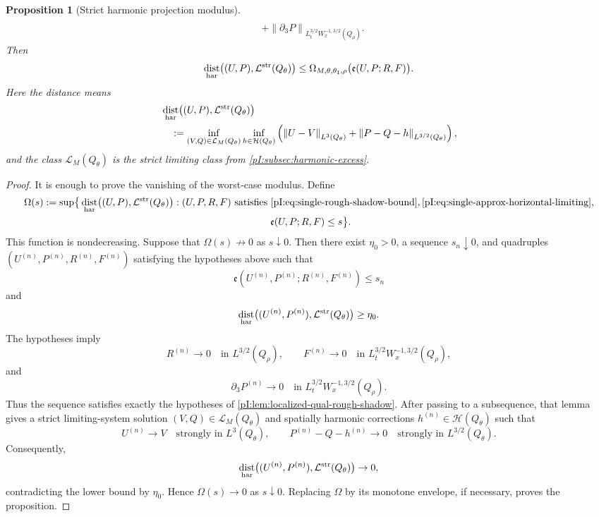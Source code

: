 \documentclass[11pt]{article}
\numberwithin{equation}{section}
\theoremstyle{plain}
\newtheorem{proposition}{Proposition}[section]
\theoremstyle{definition}
\theoremstyle{remark}
\DeclareMathOperator{\dist}{dist}
\newcommand{\norm}[2]{\left\|#1\right\|_{#2}}
\newcommand{\calH}{\mathcal H}
\newcommand{\calL}{\mathcal L}
\begin{document}
\begin{proposition}[Strict harmonic projection modulus]
\begin{equation}
\begin{aligned}
        \\
        &+\norm{\partial_3P}{L^{3/2}_tW^{-1,3/2}_x(Q_\rho)} .
\end{aligned}
\end{equation}
Then
\begin{equation}\label{pI:eq:strict-projection-modulus-bound}
        \dist_{\rm har}
        \bigl((U,P),\calL^{\rm str}(Q_\theta)\bigr)
        \le
        \Omega_{M,\theta,\theta_1,\rho}
        \bigl(\mathfrak e(U,P;R,F)\bigr).
\end{equation}
Here the distance means
\[
\begin{aligned}
&\dist_{\rm har}\bigl((U,P),\calL^{\rm str}(Q_\theta)\bigr)
\\
&\quad:=
\inf_{(V,Q)\in\calL_M(Q_\theta)}
\inf_{h\in\calH(Q_\theta)}
\left(
\norm{U-V}{L^3(Q_\theta)}
+
\norm{P-Q-h}{L^{3/2}(Q_\theta)}
\right),
\end{aligned}
\]
and the class \(\calL_M(Q_\theta)\) is the strict limiting class from \cref{pI:subsec:harmonic-excess}.
\end{proposition}

\begin{proof}
It is enough to prove the vanishing of the worst-case modulus.  Define
\[
\begin{aligned}
        \Omega(s):=\sup\bigl\{&
        \dist_{\rm har}\bigl((U,P),\calL^{\rm str}(Q_\theta)\bigr):
        (U,P,R,F)\text{ satisfies }
        \eqref{pI:eq:single-rough-shadow-bound},\eqref{pI:eq:single-approx-horizontal-limiting},
        \\
        &\hspace{6.8cm}
        \mathfrak e(U,P;R,F)\le s
        \bigr\}.
\end{aligned}
\]
This function is nondecreasing.  Suppose that \(\Omega(s)\not\to0\) as \(s\downarrow0\).  Then there exist \(\eta_0>0\), a sequence \(s_n\downarrow0\), and quadruples \((U^{(n)},P^{(n)},R^{(n)},F^{(n)})\) satisfying the hypotheses above such that
\[
        \mathfrak e(U^{(n)},P^{(n)};R^{(n)},F^{(n)})\le s_n
\]
and
\[
        \dist_{\rm har}
        \bigl((U^{(n)},P^{(n)}),\calL^{\rm str}(Q_\theta)\bigr)
        \ge \eta_0 .
\]
The hypotheses imply
\[
        R^{(n)}\to0\quad\text{in }L^{3/2}(Q_\rho),
        \qquad
        F^{(n)}\to0\quad\text{in }L^{3/2}_tW^{-1,3/2}_x(Q_\rho),
\]
and
\[
        \partial_3P^{(n)}\to0
        \quad\text{in }L^{3/2}_tW^{-1,3/2}_x(Q_\rho).
\]
Thus the sequence satisfies exactly the hypotheses of \cref{pI:lem:localized-qual-rough-shadow}.  After passing to a subsequence, that lemma gives a strict limiting-system solution \((V,Q)\in\calL_M(Q_\theta)\) and spatially harmonic corrections \(h^{(n)}\in\calH(Q_\theta)\) such that
\[
        U^{(n)}\to V\quad\text{strongly in }L^3(Q_\theta),
        \qquad
        P^{(n)}-Q-h^{(n)}\to0
        \quad\text{strongly in }L^{3/2}(Q_\theta).
\]
Consequently,
\[
        \dist_{\rm har}
        \bigl((U^{(n)},P^{(n)}),\calL^{\rm str}(Q_\theta)\bigr)
        \to0,
\]
contradicting the lower bound by \(\eta_0\).  Hence \(\Omega(s)\to0\) as \(s\downarrow0\).  Replacing \(\Omega\) by its monotone envelope, if necessary, proves the proposition.
\end{proof}
\end{document}
